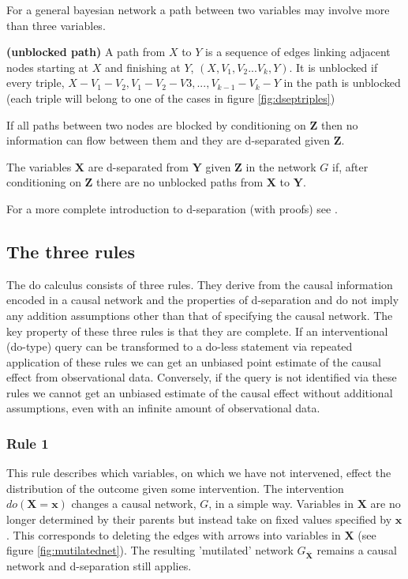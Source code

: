 \documentclass[11pt,a4paper]{article}
\begin{document}
For a general bayesian network a path between two variables may involve more than three variables. 

\begin{definition}
\textbf{(unblocked path)} A path from $X$ to $Y$ is a sequence of edges linking adjacent nodes starting at $X$ and finishing at $Y$,  $(X,V_{1},V_{2}...V_{k},Y)$. It is unblocked if every triple, $X-V_{1}-V_{2},V_{1}-V_{2}-V{3},...,V_{k-1}-V_{k}-Y$ in the path is unblocked (each triple will belong to one of the cases in figure \ref{fig:dseptriples})
\end{definition}

If all paths between two nodes are blocked by conditioning on $\boldsymbol{Z}$ then no information can flow between them and they are d-separated given $\boldsymbol{Z}$. 

\begin{definition}
The variables $\boldsymbol{X}$ are d-separated from $\boldsymbol{Y}$ given $\boldsymbol{Z}$ in the network $G$ if, after conditioning on $\boldsymbol{Z}$ there are no unblocked paths from $\boldsymbol{X}$ to $\boldsymbol{Y}$.  
\end{definition}

For a more complete introduction to d-separation (with proofs) see \cite{Koller2009}.

\subsection{The three rules}
The do calculus consists of three rules. They derive from the causal information encoded in a causal network and the properties of d-separation and do not imply any addition assumptions other than that of specifying the causal network. The key property of these three rules is that they are complete. If an interventional (do-type) query can be transformed to a do-less statement via repeated application of these rules we can get an unbiased point estimate of the causal effect from observational data. Conversely, if the query is not identified via these rules we cannot get an unbiased estimate of the causal effect without additional assumptions, even with an infinite amount of observational data. 

\subsubsection{Rule 1}
This rule describes which variables, on which we have not intervened, effect the distribution of the outcome given some intervention. The intervention $do(\boldsymbol{X}=\boldsymbol{x})$ changes a causal network, $G$, in a simple way. Variables in $\boldsymbol{X}$ are no longer determined by their parents but instead take on fixed values specified by $\boldsymbol{x}$. This corresponds to deleting the edges with arrows into variables in $\boldsymbol{X}$  (see figure \ref{fig:mutilatednet}). The resulting 'mutilated' network $G_{\overline{\boldsymbol{X}}}$ remains a causal network and d-separation still applies. 
\end{document}
